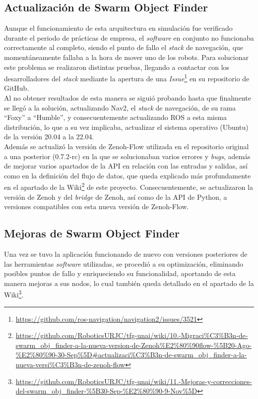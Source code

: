 \subsection{Actualización de Swarm Object Finder}
\label{sec:actualizacion_swarm_obj_finder}

Aunque el funcionamiento de esta arquitectura en simulación fue verificado
durante el periodo de prácticas de empresa, el \textit{software} en conjunto no
funcionaba correctamente al completo, siendo el punto de fallo el \textit{stack}
de navegación, que momentáneamente fallaba a la hora de mover uno de los robots.
Para solucionar este problema se realizaron distintas pruebas, llegando a
contactar con los desarrolladores del \textit{stack} mediante la apertura de una
\textit{Issue}\footnote{
\url{https://github.com/ros-navigation/navigation2/issues/3521}} en su
repositorio de GitHub.
\\

Al no obtener resultados de esta manera se siguió probando hasta que finalmente
se llegó a la solución, actualizando Nav2, el \textit{stack} de navegación, de
su rama ``Foxy'' a ``Humble'', y consecuentemente actualizando ROS a esta misma
distribución, lo que a su vez implicaba, actualizar el sistema operativo
(Ubuntu) de la versión 20.04 a la 22.04.
\\

Además se actualizó la versión de Zenoh-Flow utilizada en el repositorio
original a una posterior (0.7.2-rc) en la que se solucionaban varios errores y
\textit{bugs}, además de mejorar varios apartados de la API en relación con las
entradas y salidas, así como en la definición del flujo de datos, que queda
explicado más profundamente en el apartado de la Wiki\footnote{
\url{https://github.com/RoboticsURJC/tfg-unai/wiki/10.-Migraci\%C3\%B3n-de-swarm\_obj\_finder-a-la-nueva-version-de-Zenoh\%E2\%80\%90flow-\%5B20-Ago-\%E2\%80\%90-30-Sep\%5D\#actualizaci\%C3\%B3n-de-swarm\_obj\_finder-a-la-nueva-versi\%C3\%B3n-de-zenoh-flow}}
de este proyecto.
Consecuentemente, se actualizaron la versión de Zenoh y del \textit{bridge} de
Zenoh, así como de la API de Python, a versiones compatibles con esta nueva
versión de Zenoh-Flow.
\\

\subsection{Mejoras de Swarm Object Finder}
\label{sec:mejoras_swarm_obj_finder}

Una vez se tuvo la aplicación funcionando de nuevo con versiones posteriores de
las herramientas \textit{software} utilizadas, se procedió a su optimización,
eliminando posibles puntos de fallo y enriqueciendo su funcionalidad, aportando
de esta manera mejoras a sus nodos, lo cual también queda detallado en el
apartado de la Wiki\footnote{
\url{https://github.com/RoboticsURJC/tfg-unai/wiki/11.-Mejoras-y-correcciones-del-swarm\_obj\_finder-\%5B30-Sep-\%E2\%80\%90-9-Nov\%5D}}.
\\

